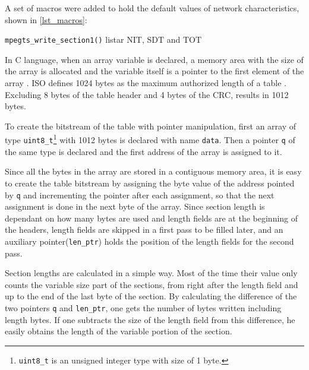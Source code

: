 \documentclass[
	12pt,				%
	openright,			%
	twoside,			%
	a4paper,			%
	brazil,
	french,				%
	english
	]{abntex2}
\begin{document}
A set of macros were added to hold the default values of network characteristics, shown in \autoref{lst_macros}:

\texttt{mpegts\_write\_section1()}
listar NIT, SDT and TOT

In C language, when an array variable is declared, a memory area with the size of the array is allocated and the variable itself is a pointer to the first element of the array . ISO defines 1024 bytes as the maximum authorized length of a table . Excluding 8 bytes of the table header and 4 bytes of the CRC, results in 1012 bytes.

To create the bitstream of the table with pointer manipulation, first an array of type \texttt{uint8\_t}\footnote{\texttt{uint8\_t} is an unsigned integer type with size of 1 byte.} with 1012 bytes is declared with name \texttt{data}. Then a pointer \texttt{q} of the same type is declared and the first address of the array is assigned to it.

Since all the bytes in the array are stored in a contiguous memory area, it is easy to create the table bitstream by assigning the byte value of the address pointed by \texttt{q} and incrementing the pointer after each assignment, so that the next assignment is done in the next byte of the array. Since section length is dependant on how many bytes are used and length fields are at the beginning of the headers, length fields are skipped in a first pass to be filled later, and an auxiliary pointer(\texttt{len\_ptr}) holds the position of the length fields for the second pass. 

Section lengths are calculated in a simple way. Most of the time their value only counts the variable size part of the sections, from right after the length field and up to the end of the last byte of the section. By calculating the difference of the two pointers \texttt{q} and \texttt{len\_ptr}, one gets the number of bytes written including length bytes. If one subtracts the size of the length field from this difference, he easily obtains the length of the variable portion of the section.
\end{document}
